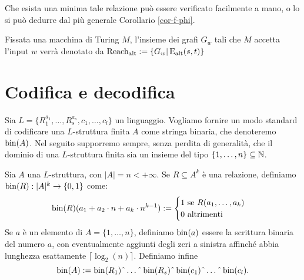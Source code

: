 Che esista una minima tale relazione può essere verificato facilmente a mano, o
lo si può dedurre dal più generale Corollario \ref{cor-f-phi}.
\begin{definizione}
\label{def:Ralt}
 Fissata una macchina di Turing $M$,
 l'insieme dei grafi $G_w$ tali che $M$ accetta l'input $w$ verrà denotato da
 $\operatorname{Reach_{alt}} := \{G_w | \operatorname{E_{alt}}(s,t) \}$
\end{definizione}


\section{Codifica e decodifica}
Sia $L=\{R^{a_1}_1, \ldots, R^{a_s}_s, c_1, \ldots, c_l\}$ un linguaggio.
Vogliamo fornire un modo standard di codificare una $L$-struttura finita $A$ come
stringa binaria, che denoteremo $\operatorname{bin}(A)$. Nel seguito supporremo sempre, senza
perdita di generalità, che
il dominio di una $L$-struttura finita sia un insieme del tipo
$\{1,\ldots,n\} \subseteq \mathbb{N}$.

\begin{definizione}
  Sia $A$ una $L$-struttura, con $|A| = n < +\infty$.
  Se $R \subseteq A^k$ è una relazione,
  definiamo $\operatorname{bin}(R): |A|^k \to \{0,1\}$ come:
  \[\operatorname{bin}(R)(a_1 + a_2 \cdot n + a_k \cdot n^{k-1}):=
    \begin{cases}
      1 \mbox{ se } R(a_1,\ldots,a_k) \\
      0 \mbox{ altrimenti}
    \end{cases}
  \]
  Se $a$ è un elemento di $A=\{1,\ldots,n\}$, definiamo $\operatorname{bin}(a)$ essere la
  scrittura binaria del numero $a$, con eventualmente aggiunti degli zeri a
  sinistra affinché abbia lunghezza esattamente $\lceil \log_2(n) \rceil$.
  Definiamo infine
  \[\bin(A):=\bin(R_1)\string^\ldots\string^\bin(R_s)\string^\bin(c_1)\string^\ldots\string^\bin(c_l).\]
\end{definizione}

